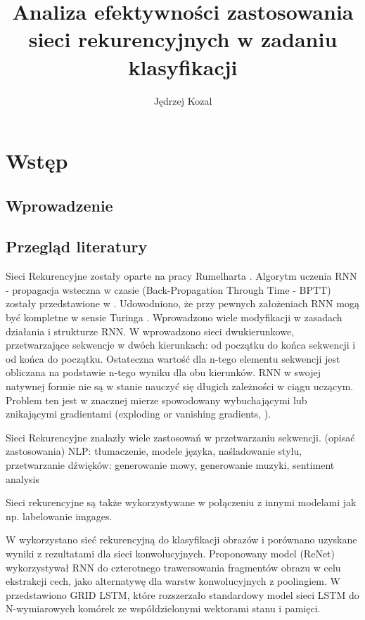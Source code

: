 \documentclass[oneside, mag]{mgr}
\title{Analiza efektywności zastosowania sieci rekurencyjnych w zadaniu klasyfikacji}
\author{Jędrzej Kozal}
\begin{document}
	

\maketitle

\chapter{Wstęp}

\section{Wprowadzenie}

\cite{Goodfellow-et-al-2016}

\section{Przegląd literatury}

Sieci Rekurencyjne zostały oparte na pracy Rumelharta \cite{RNN}. Algorytm uczenia RNN - propagacja wsteczna w czasie (Back-Propagation Through Time - BPTT) zostały przedstawione w \cite{BPTT}.
Udowodniono, że przy pewnych założeniach RNN mogą być kompletne w sensie Turinga \cite{turing-complete}.
Wprowadzono wiele modyfikacji w zasadach działania i strukturze RNN. W \cite{bidirectional} wprowadzono sieci dwukierunkowe, przetwarzające sekwencje w dwóch kierunkach: od początku do końca sekwencji i od końca do początku. Ostateczna wartość dla n-tego elementu sekwencji jest obliczana na podstawie n-tego wyniku dla obu kierunków.
RNN w swojej natywnej formie nie są w stanie nauczyć się długich zależności w ciągu uczącym. Problem ten jest w znacznej mierze spowodowany wybuchającymi lub znikającymi gradientami (exploding or vanishing gradients, \cite{vanishing_gradient_RNN}).

Sieci Rekurencyjne znalazły wiele zastosowań w przetwarzaniu sekwencji. (opisać zastosowania) NLP: tłumaczenie, modele języka, naśladowanie stylu, przetwarzanie dźwięków: generowanie mowy, generowanie muzyki, sentiment analysis 

Sieci rekurencyjne są także wykorzystywane w połączeniu z innymi modelami jak np. labelowanie imgages.

W \cite{DBLP:journals/corr/VisinKCMCB15} wykorzystano sieć rekurencyjną do klasyfikacji obrazów i porównano uzyskane wyniki z rezultatami dla sieci konwolucyjnych. Proponowany model (ReNet) wykorzystywał RNN do czterotnego trawersowania fragmentów obrazu w celu ekstrakcji cech, jako alternatywę dla warstw konwolucyjnych z poolingiem. W \cite{DBLP:journals/corr/KalchbrennerDG15} przedstawiono GRID LSTM, które rozszerzało standardowy model sieci LSTM do N-wymiarowych komórek ze współdzielonymi wektorami stanu i pamięci.
\end{document}
